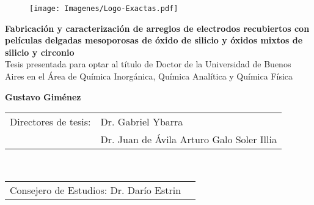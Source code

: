 \begin{titlepage}


		\begin{figure}[t!]
		\centering
		\texttt{[image: Imagenes/Logo-Exactas.pdf]}%
	 	\end{figure}

		\begin{center}
		\vspace*{1cm}
		\end{center}

		

	 	\begin{center}
	 	\large{\bfseries{Fabricación y caracterización de arreglos de electrodos recubiertos con películas delgadas mesoporosas de óxido de silicio y óxidos mixtos de silicio y circonio}} \\ \vspace*{0.5cm}
	 	\normalsize{Tesis presentada para optar al título de Doctor de la Universidad de Buenos Aires en el Área de Química Inorgánica, Química Analítica y Química Física} \\ \vspace*{1.2cm}
	 	
	 	\Large{\bfseries{Gustavo Giménez}} \\ 
	 	\end{center}
		
		\vspace*{2cm}

		\setlength\tabcolsep{1.5pt}
		\noindent\begin{tabular}{@{}ll}
		Directores de tesis:&Dr. Gabriel Ybarra\\  %
		 &Dr. Juan de Ávila Arturo Galo Soler Illia\\						%
		\end{tabular} \\
		\noindent\begin{tabular}{@{}ll}
		Consejero de Estudios: Dr. Darío Estrin \\ %
		\end{tabular} \\ 


\end{titlepage}
